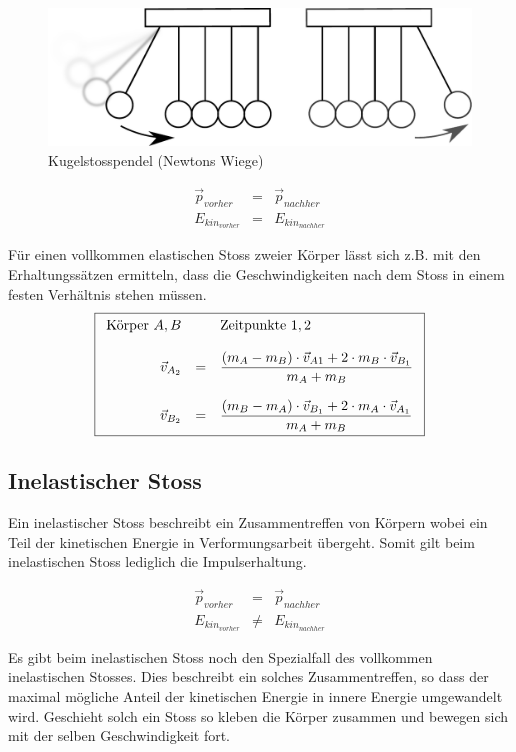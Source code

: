 \begin{figure}[h!]
	\centering
	\includegraphics[scale=0.4]{kugelstosspendel.pdf}
	\caption{Kugelstosspendel (Newtons Wiege)}
\end{figure}

\[ \boxed{
	\begin{array}{rcl}
		\vec{p}_{vorher} &= &\vec{p}_{nachher} \\
		E_{kin_{vorher}} &= &E_{kin_{nachher}}
	\end{array}
}\]

\noindent
Für einen vollkommen elastischen Stoss zweier Körper lässt sich z.B. mit
den Erhaltungssätzen ermitteln, dass die Geschwindigkeiten nach dem Stoss
in einem festen Verhältnis stehen müssen.
\[ \boxed{\begin{array}{r c l}
	\text{Körper } A,B & & \text{Zeitpunkte } 1,2  \\
	& & \\
	\vec{v}_{A_2} & = & \displaystyle
		\frac{(m_A-m_B)\cdot\vec{v}_{A1}
			+2\cdot m_B\cdot\vec{v}_{B_1}}
			{m_A + m_B} \\
	& & \\
	\vec{v}_{B_2} & = & \displaystyle
		\frac{(m_B-m_A)\cdot\vec{v}_{B_1}
			+2\cdot m_A \cdot \vec{v}_{A_1}}
			{m_A + m_B}
\end{array}} \]

\subsection{Inelastischer Stoss}
Ein inelastischer Stoss beschreibt ein Zusammentreffen von Körpern wobei ein
Teil der kinetischen Energie in Verformungsarbeit übergeht. Somit gilt beim
inelastischen Stoss lediglich die Impulserhaltung. 

\[ \boxed{
	\begin{array}{rcl}
		\vec{p}_{vorher} &= &\vec{p}_{nachher} \\
		E_{kin_{vorher}} &\neq &E_{kin_{nachher}}
	\end{array}
} \]

\noindent
Es gibt beim inelastischen Stoss noch den Spezialfall des vollkommen 
inelastischen Stosses. Dies beschreibt ein solches Zusammentreffen, so dass
der maximal mögliche Anteil der kinetischen Energie in innere Energie
umgewandelt wird. Geschieht solch ein Stoss so kleben die Körper zusammen
und bewegen sich mit der selben Geschwindigkeit fort.

